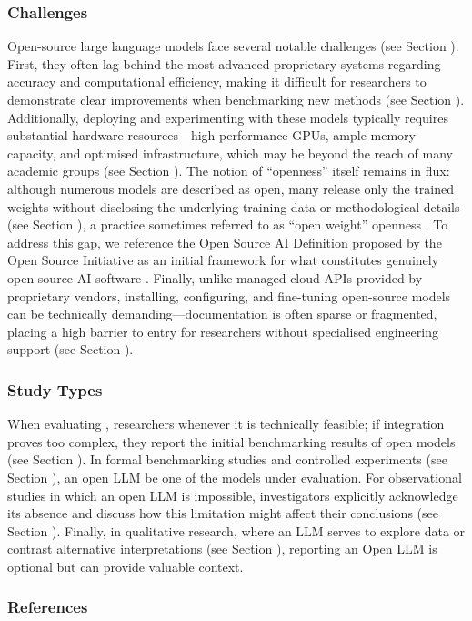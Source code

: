 \subsubsection{Challenges}

Open-source large language models face several notable challenges (see Section \limitationsmitigations). First, they often lag behind the most advanced proprietary systems regarding accuracy and computational efficiency, making it difficult for researchers to demonstrate clear improvements when benchmarking new methods (see Section \benchmarksmetrics). Additionally, deploying and experimenting with these models typically requires substantial hardware resources—high-performance GPUs, ample memory capacity, and optimised infrastructure, which may be beyond the reach of many academic groups (see Section \toolarchitecture). The notion of “openness” itself remains in flux: although numerous models are described as open, many release only the trained weights without disclosing the underlying training data or methodological details (see Section \modelversion), a practice sometimes referred to as ``open weight'' openness \cite{Gibney2024}. To address this gap, we reference the Open Source AI Definition proposed by the Open Source Initiative as an initial framework for what constitutes genuinely open-source AI software \cite{OSIAI2024}. Finally, unlike managed cloud APIs provided by proprietary vendors, installing, configuring, and fine-tuning open-source models can be technically demanding—documentation is often sparse or fragmented, placing a high barrier to entry for researchers without specialised engineering support (see Section \limitationsmitigations).

\subsubsection{Study Types}

When evaluating \newtools, researchers \should \openllm whenever it is technically feasible; if integration proves too complex, they \must report the initial benchmarking results of open models (see Section \benchmarksmetrics). In formal benchmarking studies and controlled experiments (see Section \benchmarkingtasks), an open LLM \must be one of the models under evaluation. For observational studies in which an open LLM is impossible, investigators \should explicitly acknowledge its absence and discuss how this limitation might affect their conclusions (see Section \limitationsmitigations). Finally, in qualitative research, where an LLM serves to explore data or contrast alternative interpretations (see Section \synthesis), reporting an Open LLM is optional but can provide valuable context.


\subsubsection{References}





